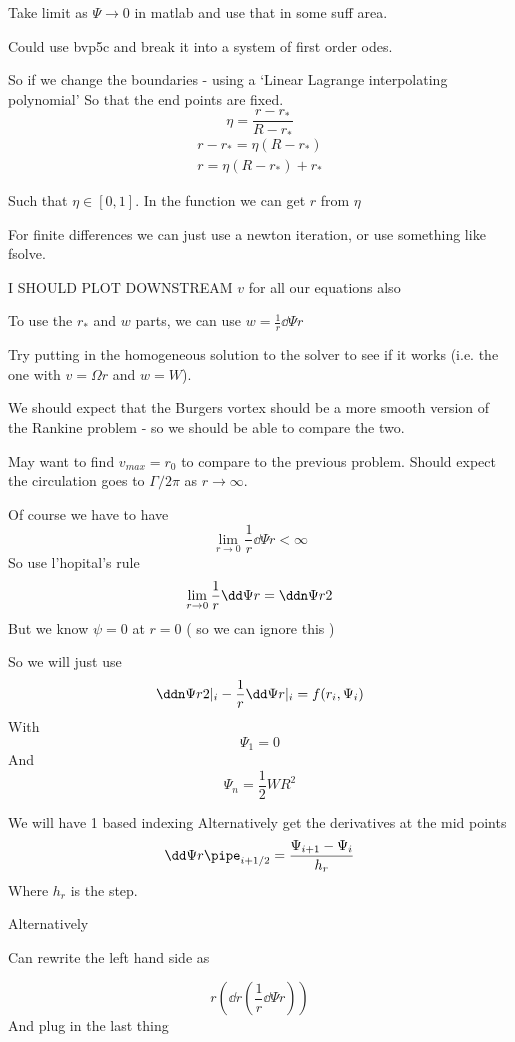 \documentclass{X:/Documents/Coding/Latex/myreport}
\begin{document}
Take limit as $\Psi\to0$ in matlab and use that in some suff area.

Could use bvp5c and break it into a system of first order odes.


So if we change the boundaries - using a `Linear Lagrange interpolating polynomial'
So that the end points are fixed.
\[\eta = \frac{r-r_*}{R-r_*}\]
\begin{align*}
    r-r_* = \eta(R-r_*)\\
    r = \eta(R-r_*) + r_*   
\end{align*}


Such that $\eta \in [0,1]$.
In the function we can get $r$ from $\eta$ 

For finite differences we can just use a newton iteration, or use something like fsolve.



I SHOULD PLOT DOWNSTREAM $v$ for all our equations also



To use the $r_*$ and $w$ parts, we can use $w = \frac1r\dd\Psi r $


Try putting in the homogeneous solution to the solver to see if it works (i.e. the one with $v = \Omega r$ and $w=W$).

We should expect that the Burgers vortex should be a more smooth version of the Rankine problem - so we should be able to compare the two.

May want to find $v_{max} = r_0$ to compare to the previous problem.
Should expect the circulation goes to $\Gamma / 2 \pi$ as $r\to \infty$.




Of course we have to have
\[\lim_{r\to 0} \frac1r \dd\Psi r < \infty\]
So use l'hopital's rule
\[\lim_{r\to 0} \frac1r \dd\Psi r = \ddn\Psi r2\]
But we know $\psi = 0$ at $r=0$ ( so we can ignore this )



So we will just use
\[\ddn \Psi r2 |_i - \frac1r \dd\Psi r|_i = f(r_i,\Psi_i)\]
With 
\[\Psi_1 = 0\]
And
\[\Psi_n = \frac12 WR^2\]

We will have 1 based indexing 
Alternatively 
get the derivatives at the mid points
\[\dd\Psi r\pipe_{i+1/2} = \frac{\Psi_{i+1} - \Psi_i}{h_r}\]
Where $h_r$ is the step.





Alternatively


Can rewrite the left hand side as

\[r\left(\dd{}r \left(\frac1r \dd\Psi r\right)\right)\]
And plug in the last thing
\[\]
\end{document}
